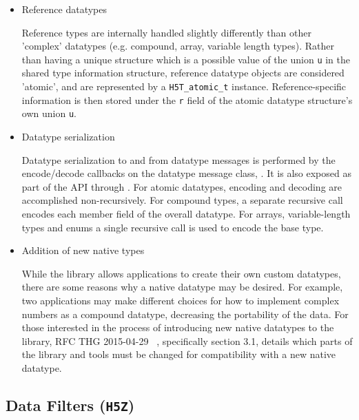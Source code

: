 \begin{itemize}
    \item Reference datatypes

Reference types are internally handled slightly differently than other 'complex' datatypes (e.g. compound, array, variable length types). Rather than having a unique structure which is a possible value of the union \texttt{u} in the shared type information structure, reference datatype objects are considered 'atomic', and are represented by a \texttt{H5T\_atomic\_t} instance. Reference-specific information is then stored under the \texttt{r} field of the atomic datatype structure's own union \texttt{u}.

    \item Datatype serialization

Datatype serialization to and from datatype messages is performed by the encode/decode callbacks on the datatype message class, . It is also exposed as part of the API through . For atomic datatypes, encoding and decoding are accomplished non-recursively. For compound
types, a separate recursive call encodes each member field of the overall datatype. For arrays, variable-length types and enums a single recursive call is used to encode the base type.

    \item Addition of new native types

While the library allows applications to create their own custom datatypes, there are some reasons why a native datatype may be desired. For example, two applications may make different choices for how to implement complex numbers as a compound datatype, decreasing the portability of the data. For those interested in the process of introducing new native datatypes to the library, RFC THG 2015-04-29 ~\cite{rfc20150429}, specifically section 3.1, details which parts of the library and tools must be changed for compatibility with a new native datatype.

\end{itemize}

\subsection{Data Filters (\texttt{H5Z})}


